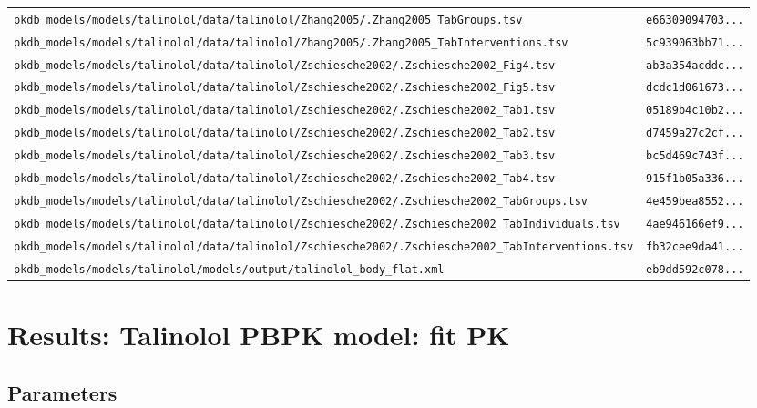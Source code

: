 \documentclass{article}
\begin{document}
\begin{longtable}{ll}
\texttt{pkdb\_models/models/talinolol/data/talinolol/Zhang2005/.Zhang2005\_TabGroups.tsv} & \texttt{e66309094703...} \\
\texttt{pkdb\_models/models/talinolol/data/talinolol/Zhang2005/.Zhang2005\_TabInterventions.tsv} & \texttt{5c939063bb71...} \\
\texttt{pkdb\_models/models/talinolol/data/talinolol/Zschiesche2002/.Zschiesche2002\_Fig4.tsv} & \texttt{ab3a354acddc...} \\
\texttt{pkdb\_models/models/talinolol/data/talinolol/Zschiesche2002/.Zschiesche2002\_Fig5.tsv} & \texttt{dcdc1d061673...} \\
\texttt{pkdb\_models/models/talinolol/data/talinolol/Zschiesche2002/.Zschiesche2002\_Tab1.tsv} & \texttt{05189b4c10b2...} \\
\texttt{pkdb\_models/models/talinolol/data/talinolol/Zschiesche2002/.Zschiesche2002\_Tab2.tsv} & \texttt{d7459a27c2cf...} \\
\texttt{pkdb\_models/models/talinolol/data/talinolol/Zschiesche2002/.Zschiesche2002\_Tab3.tsv} & \texttt{bc5d469c743f...} \\
\texttt{pkdb\_models/models/talinolol/data/talinolol/Zschiesche2002/.Zschiesche2002\_Tab4.tsv} & \texttt{915f1b05a336...} \\
\texttt{pkdb\_models/models/talinolol/data/talinolol/Zschiesche2002/.Zschiesche2002\_TabGroups.tsv} & \texttt{4e459bea8552...} \\
\texttt{pkdb\_models/models/talinolol/data/talinolol/Zschiesche2002/.Zschiesche2002\_TabIndividuals.tsv} & \texttt{4ae946166ef9...} \\
\texttt{pkdb\_models/models/talinolol/data/talinolol/Zschiesche2002/.Zschiesche2002\_TabInterventions.tsv} & \texttt{fb32cee9da41...} \\
\texttt{pkdb\_models/models/talinolol/models/output/talinolol\_body\_flat.xml} & \texttt{eb9dd592c078...} \\
\end{longtable}

\section{Results: Talinolol PBPK model: fit PK}

\subsection{Parameters}
\end{document}
